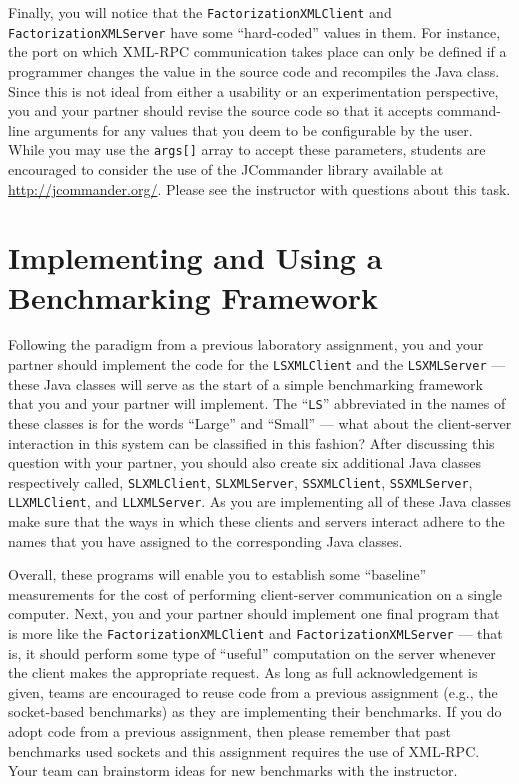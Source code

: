 Finally, you will notice that the {\tt FactorizationXMLClient} and {\tt FactorizationXMLServer} have some
``hard-coded'' values in them. For instance, the port on which XML-RPC communication takes place can only be defined if a
programmer changes the value in the source code and recompiles the Java class. Since this is not ideal from either a
usability or an experimentation perspective, you and your partner should revise the source code so that it accepts
command-line arguments for any values that you deem to be configurable by the user. While you may use the {\tt args[]}
array to accept these parameters, students are encouraged to consider the use of the JCommander library available at
\url{http://jcommander.org/}. Please see the instructor with questions about this task.

\section*{Implementing and Using a Benchmarking Framework}

Following the paradigm from a previous laboratory assignment, you and your partner should implement the code for the
{\tt LSXMLClient} and the {\tt LSXMLServer} --- these Java classes will serve as the start of a simple benchmarking
framework that you and your partner will implement. The ``{\tt LS}'' abbreviated in the names of these classes is for
the words ``Large'' and ``Small'' --- what about the client-server interaction in this system can be classified in this
fashion? After discussing this question with your partner, you should also create six additional Java classes
respectively called, {\tt SLXMLClient}, {\tt SLXMLServer}, {\tt SSXMLClient}, {\tt SSXMLServer}, {\tt LLXMLClient}, and
{\tt LLXMLServer}. As you are implementing all of these Java classes make sure that the ways in which these clients and
servers interact adhere to the names that you have assigned to the corresponding Java classes.

Overall, these programs will enable you to establish some ``baseline'' measurements for the cost of performing
client-server communication on a single computer.  Next, you and your partner should implement one final program that is
more like the {\tt FactorizationXMLClient} and {\tt FactorizationXMLServer} --- that is, it should perform some type of
``useful'' computation on the server whenever the client makes the appropriate request. As long as full acknowledgement
is given, teams are encouraged to reuse code from a previous assignment (e.g., the socket-based benchmarks) as they are
implementing their benchmarks. If you do adopt code from a previous assignment, then please remember that past
benchmarks used sockets and this assignment requires the use of XML-RPC.  Your team can brainstorm ideas for new
benchmarks with the instructor.

